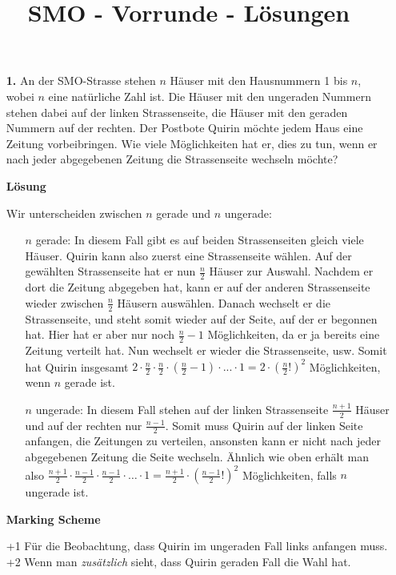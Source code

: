 \documentclass[language=german,style=solution]{smo}
\title{SMO - Vorrunde - Lösungen}
\begin{document}
\begin{enumerate}

\item[\textbf{1.}] 
An der SMO-Strasse stehen $n$ Häuser mit den Hausnummern 1 bis $n$, wobei $n$ eine natürliche Zahl ist. Die Häuser mit den ungeraden Nummern stehen dabei auf der linken Strassenseite, die Häuser mit den geraden Nummern auf der rechten. Der Postbote Quirin möchte jedem Haus eine Zeitung vorbeibringen. Wie viele Möglichkeiten hat er, dies zu tun, wenn er nach jeder abgegebenen Zeitung die Strassenseite wechseln möchte?

\textbf{Lösung}

Wir unterscheiden zwischen $n$ gerade und $n$ ungerade:

\begin{minipage}{0.08\textwidth}
\mbox{}
\end{minipage}
\begin{minipage}{0.86\textwidth}
\begin{enumerate}
\item[$n$ gerade:] In diesem Fall gibt es auf beiden Strassenseiten gleich viele Häuser. Quirin kann also zuerst eine Strassenseite wählen. Auf der gewählten Strassenseite hat er nun $\frac{n}{2}$ Häuser zur Auswahl. Nachdem er dort die Zeitung abgegeben hat, kann er auf der anderen Strassenseite wieder zwischen $\frac{n}{2}$ Häusern auswählen. Danach wechselt er die Strassenseite, und steht somit wieder auf der Seite, auf der er begonnen hat. Hier hat er aber nur noch $\frac{n}{2}-1$ Möglichkeiten, da er ja bereits eine Zeitung verteilt hat. Nun wechselt er wieder die Strassenseite, usw. Somit hat Quirin insgesamt
$2 \cdot \frac{n}{2} \cdot \frac{n}{2} \cdot (\frac{n}{2}-1)\cdot ... \cdot 1 = 2\cdot(\frac{n}{2}!)^2$ Möglichkeiten, wenn $n$ gerade ist.
\item[$n$ ungerade:] In diesem Fall stehen auf der linken Strassenseite $\frac{n+1}{2}$ Häuser und auf der rechten nur $\frac{n-1}{2}$. Somit muss Quirin auf der linken Seite anfangen, die Zeitungen zu verteilen, ansonsten kann er nicht nach jeder abgegebenen Zeitung die Seite wechseln. Ähnlich wie oben erhält man also
$\frac{n+1}{2} \cdot \frac{n-1}{2}\cdot \frac{n-1}{2}\cdot \ldots \cdot 1 = \frac{n+1}{2}\cdot (\frac{n-1}{2}!)^2$ Möglichkeiten, falls $n$ ungerade ist.
\end{enumerate}
\end{minipage}

\textbf{Marking Scheme}

+1 Für die Beobachtung, dass Quirin im ungeraden Fall links anfangen muss.\\
+2 Wenn man \emph{zusätzlich} sieht, dass Quirin geraden Fall die Wahl hat.


\end{enumerate}
\end{document}
